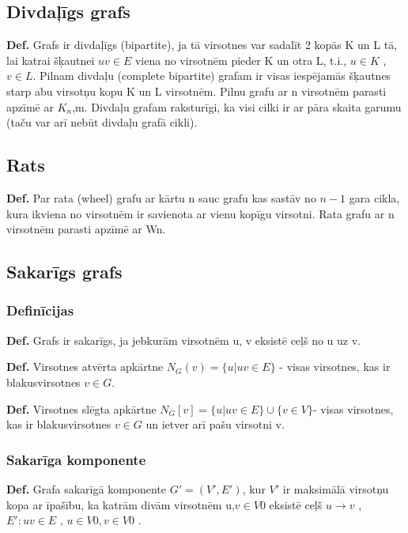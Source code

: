 \documentclass{article}
\begin{document}
\subsection{Divdaļīgs grafs}

\textbf{Def.}  Grafs ir divdaļīgs (bipartite), ja tā virsotnes var sadalīt 2 kopās K un L tā, lai katrai šķautnei $uv \in E$ viena no virsotnēm pieder K un otra L, t.i., $u \in K$ , $v \in L$.  Pilnam divdaļu (complete bipartite) grafam ir visas iespējamās šķautnes starp abu virsotņu kopu K un L virsotnēm.  Pilnu grafu ar n virsotnēm parasti apzīmē ar $K_n$,m.  Divdaļu grafam raksturīgi, ka visi cilki ir ar pāra skaita garumu (taču var arī nebūt divdaļu grafā cikli).


\subsection{Rats}

\textbf{Def.}  Par rata (wheel) grafu ar kārtu n sauc grafu kas sastāv no $n-1$ gara cikla, kura ikviena no virsotnēm ir savienota ar vienu kopīgu virsotni.  Rata grafu ar n virsotnēm parasti apzīmē ar Wn.

\subsection{Sakarīgs grafs}

\subsubsection{Definīcijas}

\textbf{Def.}  Grafs ir sakarīgs, ja jebkurām virsotnēm u, v eksistē ceļš no u uz v.


\textbf{Def.} Virsotnes atvērta apkārtne $N_G (v ) = \{u|uv \in E \}$ - visas virsotnes, kas ir blakusvirsotnes $v \in G$.

\textbf{Def.} Virsotnes slēgta apkārtne $N_G [v ] = \{u|uv \in E \} \cup \{v \in V \} $- visas virsotnes, kas ir blakusvirsotnes $v \in G$ un ietver arī pašu virsotni v.


\subsubsection{Sakarīga komponente}

\textbf{Def.}  Grafa sakarīgā komponente $G'=(V',E')$, kur $V'$ ir maksimālā virsotņu kopa ar īpašību, ka katrām divām virsotnēm u,$v \in V 0$ eksistē ceļš $ u → v$ , $E':uv \in E$ , $u \in V 0 , v \in V 0$ . 
\end{document}
